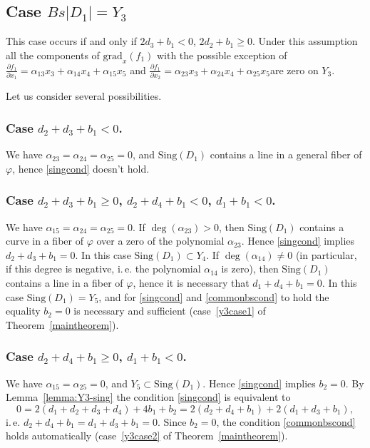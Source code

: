 \documentclass[12pt]{amsart}
\theoremstyle{definition}
\theoremstyle{remark}
\begin{document}
\subsection{Case $Bs|D_1|=Y_3$}\label{proof:Y3}

This case occurs if and only if $2d_3+b_1<0$, $2d_2+b_1\geqslant 0$.
Under this assumption all the components of ${\mathrm{grad}_x}(f_1)$
with the possible exception of 
$\frac{\partial f_1}{\partial x_1}=\alpha_{13}x_3+\alpha_{14}x_4+\alpha_{15}x_5$ and
$\frac{\partial f_1}{\partial x_2}=\alpha_{23}x_3+\alpha_{24}x_4+\alpha_{25}x_5$are zero on $Y_3$.

Let us consider several possibilities.

\subsubsection{Case $d_2+d_3+b_1<0$.} 
We have $\alpha_{23}=\alpha_{24}=\alpha_{25}=0$,
and ${\mathrm{Sing}}(D_1)$ contains a line in a general fiber of $\varphi$, 
hence \ref{singcond} doesn't hold.

\subsubsection{Case $d_2+d_3+b_1\geqslant 0$, $d_2+d_4+b_1<0$, $d_1+b_1<0$.} 
We have $\alpha_{15}=\alpha_{24}=\alpha_{25}=0$. If 
$\deg(\alpha_{23})>0$, then ${\mathrm{Sing}}(D_1)$ contains a curve in a fiber
of $\varphi$ over a zero of the polynomial $\alpha_{23}$. Hence
\ref{singcond} implies $d_2+d_3+b_1=0$. In this case 
${\mathrm{Sing}}(D_1)\subset Y_4$.
If $\deg(\alpha_{14})\neq 0$ (in particular, if this degree is negative, i.\,e.
the polynomial $\alpha_{14}$ is zero), then ${\mathrm{Sing}}(D_1)$ contains
a line in a fiber of $\varphi$, hence it is necessary that $d_1+d_4+b_1=0$. 
In this case  
${\mathrm{Sing}}(D_1)=Y_5$, and for \ref{singcond} and \ref{commonbscond} 
to hold the equality $b_2=0$ is necessary and sufficient 
(case~\ref{y3case1} of Theorem~\ref{maintheorem}).

\subsubsection{Case $d_2+d_4+b_1\geqslant 0$, $d_1+b_1<0$.} 
We have $\alpha_{15}=\alpha_{25}=0$, and $Y_5\subset{\mathrm{Sing}}(D_1)$. 
Hence \ref{singcond} implies $b_2=0$. By Lemma~\ref{lemma:Y3-sing} 
the condition \ref{singcond} is equivalent to
$$0=2(d_1+d_2+d_3+d_4)+4b_1+b_2=2(d_2+d_4+b_1)+2(d_1+d_3+b_1),$$
i.\,e. $d_2+d_4+b_1=d_1+d_3+b_1=0$. Since $b_2=0$, the condition
\ref{commonbscond} holds automatically (case~\ref{y3case2} 
of Theorem~\ref{maintheorem}).
\end{document}
